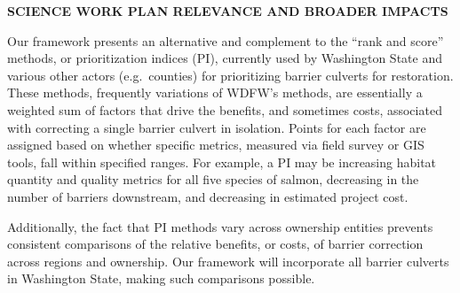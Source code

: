 \begin{center} \textbf{SCIENCE WORK PLAN RELEVANCE AND BROADER IMPACTS} \end{center}

Our framework presents an alternative and complement to the ``rank and score'' methods, or prioritization indices (PI), currently used by Washington State and various other actors (e.g.\ counties) for prioritizing barrier culverts for restoration. These methods, frequently variations of WDFW's methods, are essentially a weighted sum of factors that drive the benefits, and sometimes costs, associated with correcting a single barrier culvert in isolation. Points for each factor are assigned based on whether specific metrics, measured via field survey or GIS tools, fall within specified ranges. For example, a PI may be increasing habitat quantity and quality metrics for all five species of salmon, decreasing in the number of barriers downstream, and decreasing in estimated project cost. 

Additionally, the fact that PI methods vary across ownership entities prevents consistent comparisons of the relative benefits, or costs, of barrier correction across regions and ownership. Our framework will incorporate all barrier culverts in Washington State, making such comparisons possible.